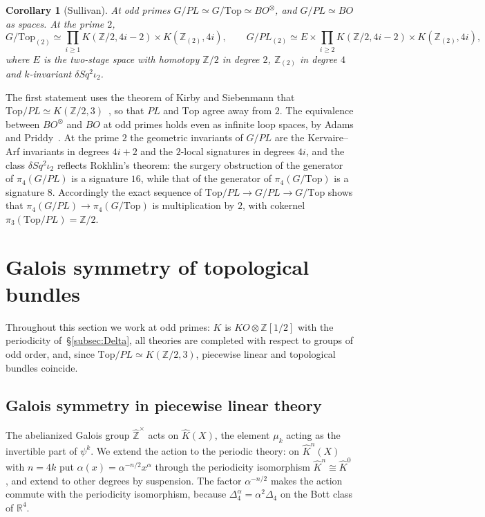 \documentclass[11pt]{amsart}
\theoremstyle{plain}
\newtheorem{corollary}[theorem]{Corollary}
\theoremstyle{definition}
\numberwithin{equation}{section}
\newcommand{\Z}{\mathbb{Z}}
\newcommand{\R}{\mathbb{R}}
\newcommand{\Zhat}{\widehat{\mathbb{Z}}}
\newcommand{\KO}{\mathit{KO}}
\newcommand{\units}{^{\times}}
\begin{document}
\begin{corollary}[Sullivan]
At odd primes $G/PL\simeq G/\mathrm{Top}\simeq BO^\otimes$, and $G/PL\simeq BO$ as spaces.
At the prime $2$,
\[
G/\mathrm{Top}_{(2)}\simeq\prod_{i\ge1}K(\Z/2,4i-2)\times K(\Z_{(2)},4i),\qquad G/PL_{(2)}\simeq E\times\prod_{i\ge2}K(\Z/2,4i-2)\times K(\Z_{(2)},4i),
\]
where $E$ is the two-stage space with homotopy $\Z/2$ in degree $2$, $\Z_{(2)}$ in degree $4$ and $k$-invariant $\delta Sq^2\iota_2$.
\end{corollary}

The first statement uses the theorem of Kirby and Siebenmann that $\mathrm{Top}/PL\simeq K(\Z/2,3)$~\cite{KirbySiebenmann}, so that $PL$ and $\mathrm{Top}$ agree away from $2$.
The equivalence between $BO^\otimes$ and $BO$ at odd primes holds even as infinite loop spaces, by Adams and Priddy~\cite{AdamsPriddy}.
At the prime $2$ the geometric invariants of $G/PL$ are the Kervaire--Arf invariants in degrees $4i+2$ and the $2$-local signatures in degrees $4i$, and the class $\delta Sq^2\iota_2$ reflects Rokhlin's theorem: the surgery obstruction of the generator of $\pi_4(G/PL)$ is a signature $16$, while that of the generator of $\pi_4(G/\mathrm{Top})$ is a signature $8$.
Accordingly the exact sequence of $\mathrm{Top}/PL\to G/PL\to G/\mathrm{Top}$ shows that $\pi_4(G/PL)\to\pi_4(G/\mathrm{Top})$ is multiplication by $2$, with cokernel $\pi_3(\mathrm{Top}/PL)=\Z/2$.

\section{Galois symmetry of topological bundles}\label{sec:galoisbundles}

Throughout this section we work at odd primes: $K$ is $\KO\otimes\Z[1/2]$ with the periodicity of~\S\ref{subsec:Delta}, all theories are completed with respect to groups of odd order, and, since $\mathrm{Top}/PL\simeq K(\Z/2,3)$, piecewise linear and topological bundles coincide.

\subsection{Galois symmetry in piecewise linear theory}
The abelianized Galois group $\Zhat\units$ acts on $\widehat K(X)$, the element $\mu_k$ acting as the invertible part of $\psi^k$.
We extend the action to the periodic theory: on $\widehat K^n(X)$ with $n=4k$ put $\alpha(x)=\alpha^{-n/2}x^\alpha$ through the periodicity isomorphism $\widehat K^n\cong\widehat K^0$, and extend to other degrees by suspension.
The factor $\alpha^{-n/2}$ makes the action commute with the periodicity isomorphism, because $\Delta_4^\alpha=\alpha^2\Delta_4$ on the Bott class of $\R^4$.
\end{document}
